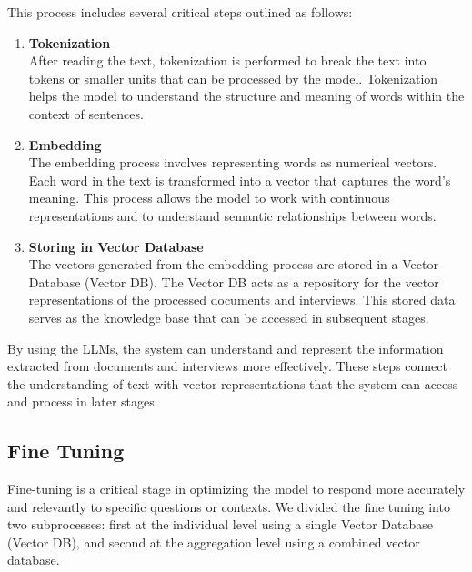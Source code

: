 \documentclass[runningheads]{llncs}
\begin{document}
This process includes several critical steps outlined as follows:

\begin{enumerate}  
    \item \textbf{Tokenization} \\
    After reading the text, tokenization is performed to break the text into tokens or smaller units that can be processed by the model. Tokenization helps the model to understand the structure and meaning of words within the context of sentences.
    
    \item \textbf{Embedding} \\
    The embedding process involves representing words as numerical vectors. Each word in the text is transformed into a vector that captures the word's meaning. This process allows the model to work with continuous representations and to understand semantic relationships between words.
    
    \item \textbf{Storing in Vector Database} \\
    The vectors generated from the embedding process are stored in a Vector Database (Vector DB). The Vector DB acts as a repository for the vector representations of the processed documents and interviews. This stored data serves as the knowledge base that can be accessed in subsequent stages.
\end{enumerate}

By using the LLMs, the system can understand and represent the information extracted from documents and interviews more effectively. These steps connect the understanding of text with vector representations that the system can access and process in later stages.

\subsection{Fine Tuning}
Fine-tuning is a critical stage in optimizing the model to respond more accurately and relevantly to specific questions or contexts. We divided the fine tuning into two subprocesses: first at the individual level using a single Vector Database (Vector DB), and second at the aggregation level using a combined vector database.
\end{document}
